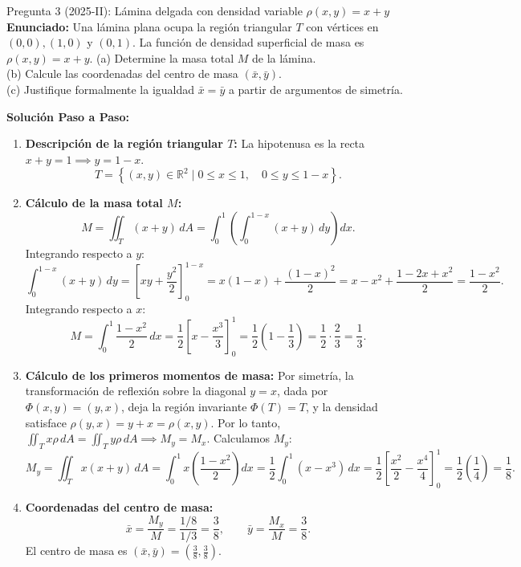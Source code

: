 \documentclass[11pt,a4paper]{article}
\begin{document}
\begin{ejerciciobox}{Pregunta 3 (2025-II): Lámina delgada con densidad variable $\rho(x,y) = x + y$}
\textbf{Enunciado:} Una lámina plana ocupa la región triangular $T$ con vértices en $(0,0), (1,0)$ y $(0,1)$. La función de densidad superficial de masa es $\rho(x,y) = x + y$.
(a) Determine la masa total $M$ de la lámina.\\
(b) Calcule las coordenadas del centro de masa $(\bar{x}, \bar{y})$.\\
(c) Justifique formalmente la igualdad $\bar{x} = \bar{y}$ a partir de argumentos de simetría.

\tcblower
\textbf{Solución Paso a Paso:}
\begin{enumerate}[leftmargin=*]
\item \textbf{Descripción de la región triangular $T$:}
La hipotenusa es la recta $x + y = 1 \implies y = 1 - x$.
\[
T = \left\{ (x,y) \in \mathbb{R}^2 \mid 0 \leq x \leq 1, \quad 0 \leq y \leq 1 - x \right\}.
\]
\item \textbf{Cálculo de la masa total $M$:}
\[
M = \iint_T (x + y) \, dA = \int_0^1 \left( \int_0^{1-x} (x + y) \, dy \right) dx.
\]
Integrando respecto a $y$:
\[
\int_0^{1-x} (x + y) \, dy = \left[ xy + \frac{y^2}{2} \right]_0^{1-x} = x(1-x) + \frac{(1-x)^2}{2} = x - x^2 + \frac{1 - 2x + x^2}{2} = \frac{1 - x^2}{2}.
\]
Integrando respecto a $x$:
\[
M = \int_0^1 \frac{1 - x^2}{2} \, dx = \frac{1}{2} \left[ x - \frac{x^3}{3} \right]_0^1 = \frac{1}{2} \left( 1 - \frac{1}{3} \right) = \frac{1}{2} \cdot \frac{2}{3} = \frac{1}{3}.
\]
\item \textbf{Cálculo de los primeros momentos de masa:}
Por simetría, la transformación de reflexión sobre la diagonal $y = x$, dada por $\Phi(x,y) = (y,x)$, deja la región invariante $\Phi(T) = T$, y la densidad satisface $\rho(y,x) = y + x = \rho(x,y)$.
Por lo tanto, $\iint_T x \rho \, dA = \iint_T y \rho \, dA \implies M_y = M_x$.
Calculamos $M_y$:
\[
M_y = \iint_T x(x + y) \, dA = \int_0^1 x \left( \frac{1 - x^2}{2} \right) dx = \frac{1}{2} \int_0^1 (x - x^3) \, dx = \frac{1}{2} \left[ \frac{x^2}{2} - \frac{x^4}{4} \right]_0^1 = \frac{1}{2} \left( \frac{1}{4} \right) = \frac{1}{8}.
\]
\item \textbf{Coordenadas del centro de masa:}
\[
\bar{x} = \frac{M_y}{M} = \frac{1/8}{1/3} = \frac{3}{8}, \qquad \bar{y} = \frac{M_x}{M} = \frac{3}{8}.
\]
El centro de masa es $(\bar{x}, \bar{y}) = \left( \frac{3}{8}, \frac{3}{8} \right)$.
\end{enumerate}
\end{ejerciciobox}
\end{document}
